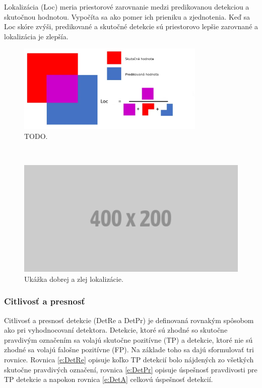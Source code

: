 Lokalizácia (Loc) meria priestorové zarovnanie medzi predikovanou detekciou a skutočnou hodnotou. Vypočíta sa ako pomer ich prieniku a zjednotenia. Keď sa Loc skóre zvýši, predikované a skutočné detekcie sú priestorovo lepšie zarovnané a lokalizácia je zlepšía.
\\
\begin{figure}[ht]
    \centering
    \includegraphics[width=0.8\textwidth]{images/05/loc.png}
    \caption{TODO.}
    \label{img:loc}
\end{figure}
\\
\begin{figure}[ht]
    \centering
    \includegraphics[width=1\textwidth]{images/placeholder.png}
    \caption{Ukážka dobrej a zlej lokalizácie.}
    \label{img:loc-img}
\end{figure}

\subsubsection{Citlivosť a presnosť}

Citlivosť a presnosť detekcie (DetRe a DetPr) je definovaná rovnakým spôsobom ako pri vyhodnocovaní detektora. Detekcie, ktoré sú zhodné so skutočne pravdivým označením sa volajú skutočne pozitívne (TP) a detekcie, ktoré nie sú zhodné sa volajú falošne pozitívne (FP). Na základe toho sa dajú sformulovať tri rovnice.
Rovnica \ref{e:DetRe} opisuje koľko TP detekcií bolo nájdených zo všetkých skutočne pravdivých označení, rovnica \ref{e:DetPr} opisuje úspešnosť pravdivosti pre TP detekcie a napokon rovnica \ref{e:DetA} celkovú úspešnosť detekcií.

